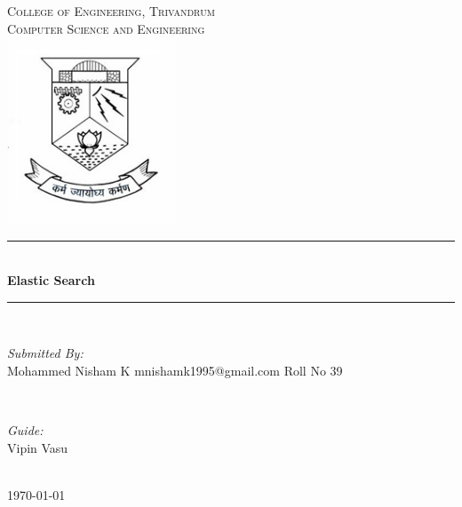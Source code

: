 \documentclass[12pt]{article}
\begin{document}
	\begin{titlepage}
		\newcommand{\HRule}{\rule{\linewidth}{0.5mm}} %
		\center %
		 

		\textsc{\LARGE College of Engineering, Trivandrum}\\[1.5cm] %
		\textsc{\Large Computer Science and Engineering}\\[0.5cm] %
		\includegraphics[width=5cm]{images/cet_emblem.jpg} 

		\HRule \\[0.4cm]
		{ \huge \bfseries Elastic Search}\\[0.4cm] %
		\HRule \\[1.5cm]

		\begin{minipage}{0.4\textwidth}
		\begin{flushleft} \large
		\emph{Submitted By:}\\
		Mohammed Nisham K %
		mnishamk1995@gmail.com
		Roll No 39
		\end{flushleft}
		\end{minipage}
		~
		\begin{minipage}{0.4\textwidth}
		\begin{flushright} \large
		\emph{Guide:} \\
		Vipin Vasu %
		\end{flushright}
		\end{minipage}\\[2cm]

		{\large \today}\\[1cm] %

		\vfill %
	\end{titlepage}
\end{document}
